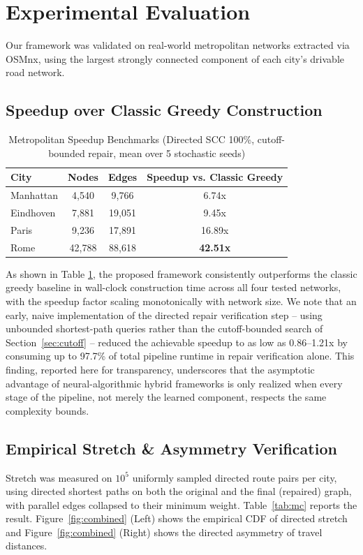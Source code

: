 \documentclass[journal]{IEEEtran}
\begin{document}
\section{Experimental Evaluation}
Our framework was validated on real-world metropolitan networks extracted via OSMnx, using the largest strongly connected component of each city's drivable road network.

\subsection{Speedup over Classic Greedy Construction}
\label{sec:speedup-results}

\begin{table}[h]
\centering
\caption{Metropolitan Speedup Benchmarks (Directed SCC 100\%, cutoff-bounded repair, mean over 5 stochastic seeds)}
\begin{tabular}{lccc}
\toprule
City & Nodes & Edges & Speedup vs. Classic Greedy \\
\midrule
Manhattan & 4,540  & 9,766  & 6.74x \\
Eindhoven & 7,881  & 19,051 & 9.45x \\
Paris     & 9,236  & 17,891 & 16.89x \\
Rome      & 42,788 & 88,618 & \textbf{42.51x} \\
\bottomrule
\end{tabular}
\label{tab:results}
\end{table}


As shown in Table \ref{tab:results}, the proposed framework consistently outperforms the classic greedy baseline in wall-clock construction time across all four tested networks, with the speedup factor scaling monotonically with network size. We note that an early, naive implementation of the directed repair verification step -- using unbounded shortest-path queries rather than the cutoff-bounded search of Section~\ref{sec:cutoff} -- reduced the achievable speedup to as low as 0.86--1.21x by consuming up to 97.7\% of total pipeline runtime in repair verification alone. This finding, reported here for transparency, underscores that the asymptotic advantage of neural-algorithmic hybrid frameworks is only realized when every stage of the pipeline, not merely the learned component, respects the same complexity bounds.

\subsection{Empirical Stretch \& Asymmetry Verification}
\label{sec:stretch}
Stretch was measured on $10^5$ uniformly sampled directed route pairs per city, using directed shortest paths on both the original and the final (repaired) graph, with parallel edges collapsed to their minimum weight. Table~\ref{tab:mc} reports the result. Figure~\ref{fig:combined} (Left) shows the empirical CDF of directed stretch and Figure~\ref{fig:combined} (Right) shows the directed asymmetry of travel distances.
\end{document}
